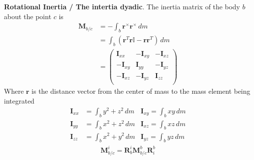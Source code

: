\textbf{Rotational Inertia / The intertia dyadic}. The inertia matrix of the body \(b\) about the point \(c\) is
\begin{align*}
    \bm{M}_{b/c} &= - \int_b \bm{r}^\times\bm{r}^\times\,dm \\
    &= \int_b (\bm{r}^T\bm{r}\mathbb{I} - \bm{r}\bm{r}^T)\,dm\\
    &= \begin{pmatrix}
        \bm{I}_{xx} & -\bm{I}_{xy} & -\bm{I}_{xz} \\
        -\bm{I}_{xy} & \bm{I}_{yy} & -\bm{I}_{yz} \\
        -\bm{I}_{xz} & -\bm{I}_{yz} & \bm{I}_{zz} \\
    \end{pmatrix}
\end{align*}
Where \(\bm{r}\) is the distance vector from the center of mass to the mass element being integrated
\begin{align*}
    \bm{I}_{xx} &= \int_b y^2 + z^2  \,dm & \bm{I}_{xy} = \int_b xy \,dm \\
    \bm{I}_{yy} &= \int_b x^2 + z^2  \,dm & \bm{I}_{xz} = \int_b xz \,dm\\
    \bm{I}_{zz} &= \int_b x^2 + y^2  \,dm & \bm{I}_{yz} = \int_b yz \,dm
\end{align*}
\begin{align*}
    \bm{M}_{b/c}^i = \bm{R}_b^i\bm{M}_{b/c}^b\bm{R}_i^b
\end{align*}

